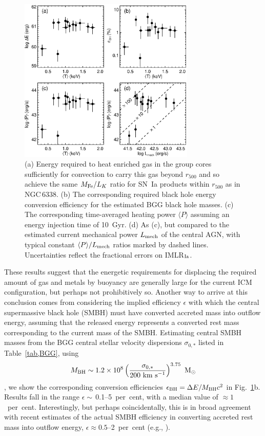 \documentclass[useAMS,usenatbib]{mn2e}
\begin{document}
\begin{figure} 
 \includegraphics[width=84mm]{fig18.eps}
 \caption{(a) Energy required to heat enriched gas in the group cores
  sufficiently for convection to carry this gas beyond $r_{500}$ and
  so achieve the same $M_{\rm Fe}/L_K$ ratio for SN~Ia products within
  $r_{500}$ as in NGC\,6338. (b) The corresponding required black hole
  energy conversion efficiency for the estimated BGG black hole
  masses. (c) The corresponding time-averaged heating power $\langle
  P\rangle$ assuming an energy injection time of 10~Gyr. (d) As (c),
  but compared to the estimated current mechanical power $L_{\rm
  mech}$ of the central AGN, with typical constant $\langle P\rangle /
  L_{\rm mech}$ ratios marked by dashed lines. Uncertainties reflect
  the fractional errors on IMLR$_{\rm Ia}$.}
\label{fig,agn} 
\end{figure} 

These results suggest that the energetic requirements for displacing
the required amount of gas and metals by buoyancy are generally large
for the current ICM configuration, but perhaps not prohibitively so.
Another way to arrive at this conclusion comes from considering the
implied efficiency $\epsilon$ with which the central supermassive
black hole (SMBH) must have converted accreted mass into outflow
energy, assuming that the released energy represents a converted rest
mass corresponding to the current mass of the SMBH. Estimating central
SMBH masses from the BGG central stellar velocity dispersions
$\sigma_{0, \ast}$ listed in Table~\ref{tab,BGG}, using
\begin{equation}
  M_{\rm BH} \sim 1.2 \times 10^8 
  \left(\frac{\sigma_{0,\ast}}{200\mbox{ km s$^{-1}$}} \right) ^{3.75}
\mbox{ M$_{\odot}$} 
\end{equation}
\citep{gebh00}, we show the corresponding conversion efficiencies
$\epsilon_{\rm BH} =\Delta E/M_{\rm BH} c^2$ in Fig.~\ref{fig,agn}b.
Results fall in the range $\epsilon \sim $\,0.1--5~per~cent, with a
median value of $\approx 1$~per~cent. Interestingly, but perhaps
coincidentally, this is in broad agreement with recent estimates of
the actual SMBH efficiency in converting accreted rest mass into
outflow energy, $\epsilon \approx 0.5$--2~per~cent (e.g.,
\citealt{alle06,merl08}).
\end{document}
